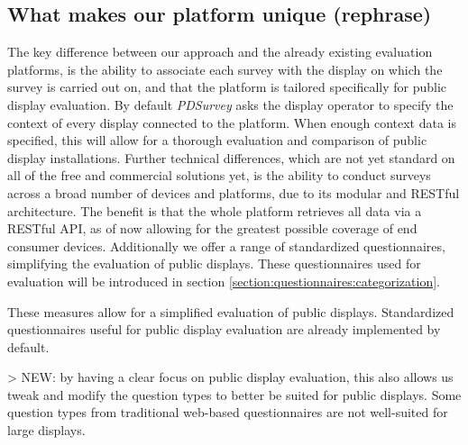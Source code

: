 	\subsection{What makes our platform unique (rephrase)}
	The key difference between our approach and the already existing evaluation platforms, is the ability to associate each survey with the display on which the survey is carried out on, and that the platform is tailored specifically for public display evaluation.
	By default \textit{PDSurvey} asks the display operator to specify the context of every display connected to the platform. When enough context data is specified, this will allow for a thorough evaluation and comparison of public display installations.
	Further technical differences, which are not yet standard on all of the free and commercial solutions yet, is the ability to conduct surveys across a broad number of devices and platforms, due to its modular and RESTful architecture. The benefit is that the whole platform retrieves all data via a RESTful API, as of now allowing for the greatest possible coverage of end consumer devices. Additionally we offer a range of standardized questionnaires, simplifying the evaluation of public displays. These questionnaires used for evaluation will be introduced in section \ref{section:questionnaires:categorization}.

	These measures allow for a simplified evaluation of public displays. Standardized questionnaires useful for public display evaluation are already implemented by default.


	> NEW: by having a clear focus on public display evaluation, this also allows us tweak and modify the question types to better be suited for public displays. Some question types from traditional web-based questionnaires are not well-suited for large displays.










